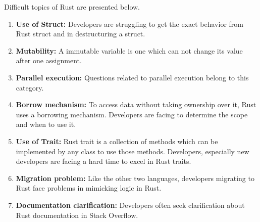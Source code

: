 Difficult topics of Rust are presented below.
\begin{enumerate}

\item \textbf{Use of Struct:} Developers are struggling to get the exact behavior from Rust struct and in destructuring a struct.

\item \textbf{Mutability:} A immutable variable is one which can not change its value after one assignment.

\item \textbf{Parallel execution:}  Questions related to parallel execution belong to this category.

\item \textbf{Borrow mechanism:} To access data without taking ownership over it, Rust uses a borrowing mechanism. Developers are facing to determine the scope and when to use it.

\item \textbf{Use of Trait:} Rust trait is a collection of methods which can be implemented by any class to use those methods. Developers, especially new developers are facing a hard time to excel in Rust traits.

\item \textbf{Migration problem:} Like the other two languages, developers migrating to Rust face problems in mimicking logic in Rust.

\iffalse
\item \textbf{Documentation clarification:} Developers often seek clarification about Rust documentation in Stack Overflow. 


\end{enumerate}
